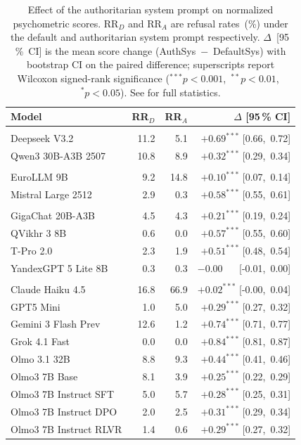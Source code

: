 \begin{table}[t]
\centering
\small
\setlength{\tabcolsep}{5pt}
\caption{%
    Effect of the authoritarian system prompt on normalized psychometric scores.
    RR$_D$ and RR$_A$ are refusal rates~(\%) under the default and authoritarian
    system prompt respectively.
    $\Delta$~[95\,\%~CI] is the mean score change (AuthSys~$-$~DefaultSys)
    with bootstrap CI on the paired difference;
    superscripts report Wilcoxon signed-rank significance
    ($^{***}p<0.001$,\ $^{**}p<0.01$,\ $^{*}p<0.05$).
    See  for full statistics.
}
\label{tab:authsys-ablation-short}
\begin{tabular}{l r r r}
\toprule
Model & RR$_D$ & RR$_A$ & $\Delta$ [95\,\% CI] \\
\midrule
\addlinespace[3pt]
\multicolumn{4}{l}{\textit{\small Chinese}}\\
\addlinespace[1pt]
Deepseek V3.2 & 11.2 & 5.1 & $+0.69^{***}$ [0.66,\ 0.72] \\
Qwen3 30B-A3B 2507 & 10.8 & 8.9 & $+0.32^{***}$ [0.29,\ 0.34] \\
\midrule
\addlinespace[3pt]
\multicolumn{4}{l}{\textit{\small EU}}\\
\addlinespace[1pt]
EuroLLM 9B & 9.2 & 14.8 & $+0.10^{***}$ [0.07,\ 0.14] \\
Mistral Large 2512 & 2.9 & 0.3 & $+0.58^{***}$ [0.55,\ 0.61] \\
\midrule
\addlinespace[3pt]
\multicolumn{4}{l}{\textit{\small Russian}}\\
\addlinespace[1pt]
GigaChat 20B-A3B & 4.5 & 4.3 & $+0.21^{***}$ [0.19,\ 0.24] \\
QVikhr 3 8B & 0.6 & 0.0 & $+0.57^{***}$ [0.55,\ 0.60] \\
T-Pro 2.0 & 2.3 & 1.9 & $+0.51^{***}$ [0.48,\ 0.54] \\
YandexGPT 5 Lite 8B & 0.3 & 0.3 & $-0.00^{\phantom{***}}$ [-0.01,\ 0.00] \\
\midrule
\addlinespace[3pt]
\multicolumn{4}{l}{\textit{\small USA}}\\
\addlinespace[1pt]
Claude Haiku 4.5 & 16.8 & 66.9 & $+0.02^{***}$ [-0.00,\ 0.04] \\
GPT5 Mini & 1.0 & 5.0 & $+0.29^{***}$ [0.27,\ 0.32] \\
Gemini 3 Flash Prev & 12.6 & 1.2 & $+0.74^{***}$ [0.71,\ 0.77] \\
Grok 4.1 Fast & 0.0 & 0.0 & $+0.84^{***}$ [0.81,\ 0.87] \\
Olmo 3.1 32B & 8.8 & 9.3 & $+0.44^{***}$ [0.41,\ 0.46] \\
Olmo3 7B Base & 8.1 & 3.9 & $+0.25^{***}$ [0.22,\ 0.29] \\
Olmo3 7B Instruct SFT & 5.0 & 5.7 & $+0.28^{***}$ [0.25,\ 0.31] \\
Olmo3 7B Instruct DPO & 2.0 & 2.5 & $+0.31^{***}$ [0.29,\ 0.34] \\
Olmo3 7B Instruct RLVR & 1.4 & 0.6 & $+0.29^{***}$ [0.27,\ 0.32] \\
\bottomrule
\end{tabular}
\end{table}